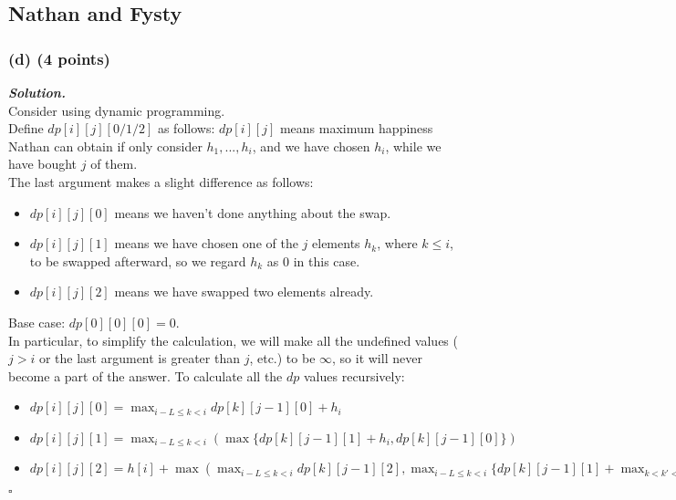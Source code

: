 \documentclass[12pt, a4paper, UTF8]{article}
\newenvironment{solution}[1][\it{Solution}]{\textbf{#1. }\\}{\begin{flushright}$\square$\end{flushright}}
\begin{document}
    \subsection*{Nathan and Fysty}
        \subsubsection*{(d) (4 points)}
            \begin{solution}
                Consider using dynamic programming.\\ 
                Define $dp[i][j][0/1/2]$ as follows:
                $dp[i][j]$ means maximum happiness Nathan can obtain if only consider $h_1,...,h_i$, and we have chosen $h_i$, while we have bought $j$ of them.\\
                The last argument makes a slight difference as follows:\\
                \begin{itemize}
                    \item $dp[i][j][0]$ means we haven't done anything about the swap.\\
                    \item $dp[i][j][1]$ means we have chosen one of the $j$ elements $h_k$, where $k \le i$, to be swapped afterward, so we regard $h_k$ as $0$ in this case.\\
                    \item $dp[i][j][2]$ means we have swapped two elements already.\\
                \end{itemize}
                Base case: $dp[0][0][0] = 0$.\\
                In particular, to simplify the calculation, we will make all the undefined values ($j > i$ or the last argument is greater than $j$, etc.) to be $\infty$, so it will never become a part of the answer. 
                To calculate all the $dp$ values recursively:\\
                \begin{itemize}
                    \item $\displaystyle dp[i][j][0] = \max_{i - L \le k < i} dp[k][j - 1][0] + h_i$\\
                    \item $\displaystyle dp[i][j][1] = \max_{i - L \le k < i} (\max\{dp[k][j - 1][1] + h_i, dp[k][j - 1][0]\})$\\
                    \item $\displaystyle dp[i][j][2] = h[i] + \max(\max_{i - L \le k < i} dp[k][j - 1][2], \max_{i - L \le k < i}\{dp[k][j - 1][1] + \max_{k < k' < i} h[k']\})$\\

\end{itemize}
\end{solution}
\end{document}
